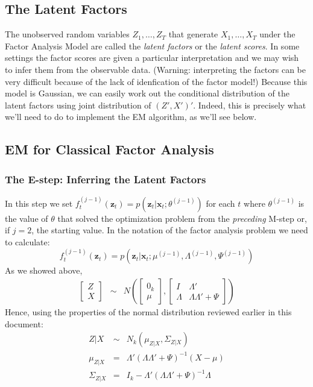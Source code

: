 \documentclass[12pt]{article}
\theoremstyle{definition}
\begin{document}
\subsection{The Latent Factors}
The unobserved random variables $Z_1, \hdots, Z_T$ that generate $X_1, \hdots, X_T$ under the Factor Analysis Model are called the \emph{latent factors} or the \emph{latent scores}. In some settings the factor scores are given a particular interpretation and we may wish to infer them from the observable data. (Warning: interpreting the factors can be very difficult because of the lack of idenfication of the factor model!) Because this model is Gaussian, we can easily work out the conditional distribution of the latent factors using joint distribution of $(Z',X')'$. Indeed, this is precisely what we'll need to do to implement the EM algorithm, as we'll see below. 


\subsection{EM for Classical Factor Analysis}

\subsubsection{The E-step: Inferring the Latent Factors} In this step we set $f_t^{(j-1)}(\mathbf{z}_t) = p(\mathbf{z}_t|\mathbf{x}_t; \theta^{(j-1)})$ for each $t$ where $\theta^{(j-1)}$ is the value of $\theta$ that solved the optimization problem from the \emph{preceding} M-step or, if $j=2$, the starting value. In the notation of the factor analysis problem we need to calculate:
	$$f_t^{(j-1)}(\mathbf{z}_t) = p(\mathbf{z}_t | \mathbf{x}_t; \mu^{(j-1)}, \Lambda^{(j-1)}, \Psi^{(j-1)})$$
As we showed above,
	\begin{eqnarray*}
		\left[\begin{array}{c}
			Z\\ X
		\end{array}\right] 
		&\sim&  N\left(
		\left[\begin{array}{c}
			0_k \\ \mu
	\end{array}\right], 
		\left[\begin{array}{cc}
			I & \Lambda'\\
			\Lambda & \Lambda \Lambda' + \Psi
		\end{array} \right] \right)
	\end{eqnarray*}
Hence, using the properties of the normal distribution reviewed earlier in this document:
	\begin{eqnarray*}
		Z|X &\sim& N_k(\mu_{Z|X}, \Sigma_{Z|X})\\
		\mu_{Z|X} &=& \Lambda' (\Lambda \Lambda' + \Psi)^{-1}(X - \mu) \\
		\Sigma_{Z|X} &=& I_k - \Lambda'(\Lambda \Lambda' + \Psi)^{-1}\Lambda
	\end{eqnarray*}
\end{document}
